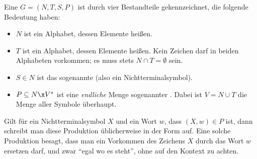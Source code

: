 Eine  $G=(N,T,S,P)$ ist durch
vier Bestandteile gekennzeichnet, die folgende Bedeutung haben:
%
\begin{itemize}
\item $N$ ist ein Alphabet, dessen Elemente
   heißen.
\item $T$ ist ein Alphabet, dessen Elemente
   heißen. Kein Zeichen
  darf in beiden Alphabeten vorkommen; es muss stets $N\cap
  T=\emptyset$ sein.
\item $S\in N$ ist das sogenannte
   (also ein
  Nichtterminalsymbol).
\item $P\subseteq N \x V^*$ ist eine \emph{endliche} Menge sogenannter
  . Dabei ist $V=N\cup T$ die
  Menge aller Symbole überhaupt.
\end{itemize}
%
Gilt für ein Nichtterminalsymbol $X$ und ein Wort $w$, dass $(X,w)\in
P$ ist, dann schreibt man diese Produktion üblicherweise in der Form
 auf. Eine solche Produktion besagt, dass man ein
Vorkommen des Zeichens $X$ durch das Wort $w$ ersetzen darf, und zwar
"`egal wo es steht"', \dh ohne auf den Kontext zu achten.  

